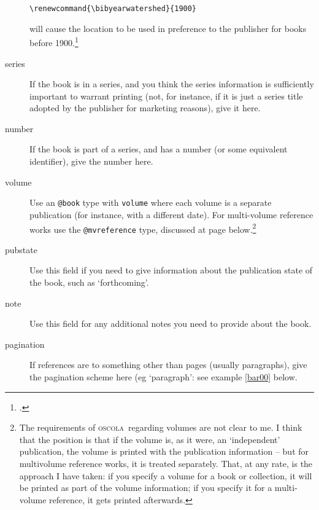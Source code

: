 \documentclass[a4paper,
               11pt,
	       DIV=1,			   
	       footinclude=false]
	      {scrartcl}
\newcommand{\oscolashort}{\textsc{oscola}\nocite{oscola}}
\begin{document}
\begin{description}
\begin{verbatim}
\renewcommand{\bibyearwatershed}{1900}
  \end{verbatim}will
  cause the location to be used in preference to the publisher for
  books before 1900.\footcite[35]{oscola}
\item[series]
  If the book is in a series, and you think the series
  information is sufficiently important to warrant printing (not, for
  instance, if it is just a series title adopted by the publisher for
  marketing reasons), give it here. 
\item[number]
  If the book is part of a series, and has a number (or
  some equivalent identifier), give the number here.
\item[volume]
  Use an \texttt{@book} type with \texttt{volume} where
  each volume is a separate publication (for instance, with a
  different date). For multi-volume reference works use the
  \texttt{@mvreference} type, discussed at page \pageref{mvreference} below.\footnote{The requirements of \oscolashort\ regarding volumes are not clear to me. I think that the position is that if the volume is, as it were, an `independent' publication, the volume is printed with the publication information -- but for multivolume reference works, it is treated separately. That, at any rate, is the approach I have taken: if you specify a volume for a book or collection, it will be printed as part of the volume information; if you specify it for a multi-volume reference, it gets printed afterwards.}
\item[pubstate] Use this field if you need to give information about
  the publication state of the book, such as `forthcoming'.
\item[note]
  Use this field for any additional notes you need to
  provide about the book.
\item[pagination]
  If references are to something other than pages
  (usually paragraphs), give the pagination scheme here (eg
  `paragraph': see example \ref{bar00} below.
\end{description}
\end{document}
